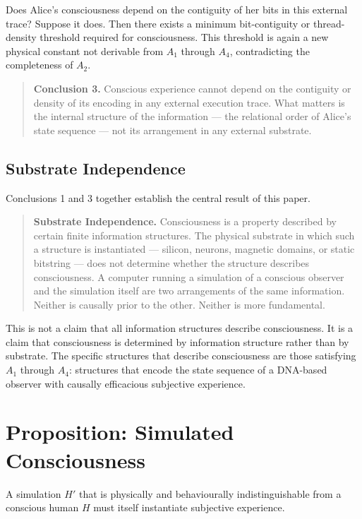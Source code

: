 \documentclass[11pt]{article}
\begin{document}
Does Alice's consciousness depend on the contiguity of her bits in this
external trace? Suppose it does. Then there exists a minimum bit-contiguity
or thread-density threshold required for consciousness. This threshold is
again a new physical constant not derivable from $A_1$ through $A_4$,
contradicting the completeness of $A_2$.

\begin{quote}
\textbf{Conclusion 3.} Conscious experience cannot depend on the contiguity
or density of its encoding in any external execution trace. What matters is
the internal structure of the information --- the relational order of Alice's
state sequence --- not its arrangement in any external substrate.
\end{quote}

\subsection{Substrate Independence}

Conclusions 1 and 3 together establish the central result of this paper.

\begin{quote}
\textbf{Substrate Independence.} Consciousness is a property described by certain
finite information structures. The physical substrate in which such a
structure is instantiated --- silicon, neurons, magnetic domains, or static
bitstring --- does not determine whether the structure describes consciousness.
A computer running a simulation of a conscious observer and the simulation
itself are two arrangements of the same information. Neither is causally
prior to the other. Neither is more fundamental. 
\end{quote}

This is not a claim that all information structures describe consciousness. It is a
claim that consciousness is determined by information structure rather than
by substrate. The specific structures that describe consciousness are those satisfying
$A_1$ through $A_4$: structures that encode the state sequence of a
DNA-based observer with causally efficacious subjective experience.

\section{Proposition: Simulated Consciousness}
\label{sec:proposition}

\begin{proposition}
A simulation $H'$ that is physically and behaviourally indistinguishable
from a conscious human $H$ must itself instantiate subjective experience.
\end{proposition}
\end{document}
